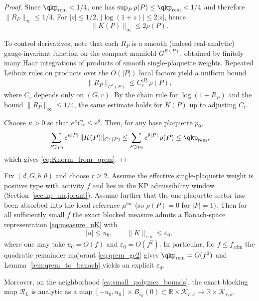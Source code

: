 \begin{proof}
Since $\qkp_{\mathrm{rem}}<1/4$, one has $\sup_P\rho(P)\le \qkp_{\mathrm{rem}}<1/4$ and therefore $\|R_P\|_{\infty}\le 1/4$.
For $|z|\le 1/2$, $|\log(1+z)|\le 2|z|$, hence
\begin{equation}\label{eq:log_bound}
\|K(P)\|_{\infty}\le 2\rho(P).
\end{equation}

To control derivatives, note that each $R_P$ is a smooth (indeed real-analytic) gauge-invariant function on the compact manifold
$G^{E(P)}$, obtained by finitely many Haar integrations of products of smooth single-plaquette weights.
Repeated Leibniz rules on products over the $O(|P|)$ local factors yield a uniform bound
\begin{equation}\label{eq:derivative_growth}
\|R_P\|_{C^r(P)}\le C_r^{|P|}\,\rho(P),
\end{equation}
where $C_r$ depends only on $(G,r)$.
By the chain rule for $\log(1+R_P)$ and the bound $\|R_P\|_{\infty}\le 1/4$, the same estimate holds for $K(P)$ up to adjusting $C_r$.

Choose $\kappa>0$ so that $e^{\kappa}C_r\le e^{\theta}$.
Then, for any base plaquette $p_0$,
\[
\sum_{P\ni p_0} e^{\kappa|P|}\,\|K(P)\|_{C^r(P)}
\le
\sum_{P\ni p_0} e^{\theta|P|}\,\rho(P)
\le\qkp_{\mathrm{rem}},
\]
which gives \eqref{eq:Knorm_from_qrem}.
\end{proof}

\begin{proposition}
\label{prop:small_polymer_neighborhood}
Fix $(d,G,b,\theta)$ and choose $r\ge 2$.
Assume the effective single-plaquette weight is positive type with activity $f$ and lies in the KP admissibility window
(Section~\ref{sec:kp_majorant}).
Assume further that the one-plaquette sector has been absorbed into the local reference $\mu^{\mathrm{loc}}$ (so $\rho(P)=0$ for $|P|=1$).
Then for all sufficiently small $f$ the exact blocked measure admits a Banach-space representation \eqref{eq:measure_uK} with
\begin{equation}\label{eq:small_polymer_bounds}
|u|\le u_0,\qquad \|K\|_{r,\kappa}\le \varepsilon_0,
\end{equation}
where one may take $u_0=O(f)$ and $\varepsilon_0=O(f^2)$.
In particular, for $f\le f_{\mathrm{adm}}$ the quadratic remainder majorant \eqref{eq:qrem_ge2} gives $\qkp_{\mathrm{rem}}=O(f^2)$ and
Lemma~\ref{lem:qrem_to_banach} yields an explicit $\varepsilon_0$.

Moreover, on the neighborhood \eqref{eq:small_polymer_bounds}, the exact blocking map $\mathcal R_L$ is analytic as a map
$[-u_0,u_0]\times B_{\varepsilon_0}(0)\subset\mathbb R\times\mathcal K_{r,\kappa}\to\mathbb R\times\mathcal K_{r,\kappa}$.
\end{proposition}

